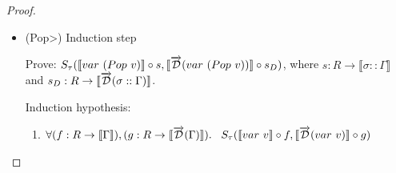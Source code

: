 \documentclass[11pt, final]{article}
\begin{document}
\begin{proof}
\begin{enumerate}
\begin{itemize}
          \begin{align*}
            S&_\tau(\llbracket var\ Top \rrbracket \circ s, \llbracket \D(var\ Top) \rrbracket \circ s_D) \\
            &\Vdash \text{(Definition of $\D$)} \\
            & S_\tau(\llbracket var\ Top \rrbracket \circ s, \llbracket var\ Top \rrbracket \circ s_D) \\
            &\Vdash \text{(Definition of $\circ$)} \\
            & S_\tau(\lambda x. \llbracket var\ Top \rrbracket (s(x)), \lambda x. \llbracket var\ Top \rrbracket (s_D(x))) \\
            &\Vdash \text{(Definition of $\llbracket\rrbracket$)} \\
            & S_\tau(\lambda x. lookup\ \llbracket Top \rrbracket (s(x)), \lambda x. lookup\ \llbracket Top \rrbracket (s_D(x))) \\
            &\Vdash \text{(Rewrite using $s = \lambda x. hd(s(x))::tl(s(x))$)} \\
            & S_\tau(\lambda x. lookup\ \llbracket Top \rrbracket (hd(s(x))::tl(s(x))), \\
              & \;\;\; \lambda x. lookup\ \llbracket Top \rrbracket (hd(s_D(x))::tl(s_D(x)))) \\
            & \Vdash \text{(Simplify with lookup and $\llbracket Top \rrbracket$)} \\
            & S_\tau(\lambda x. hd(s(x)), \lambda x. hd(s_D(x))) \\
            & \Vdash \text{(By definition of $inst_{\tau::\Gamma}$)} \\
          \end{align*} \qed

          \item(\<Pop>) Induction step

          Prove: $S_\tau(\llbracket var\ (Pop\ v) \rrbracket \circ s, \llbracket \overrightarrow{\mathcal{D}}(var\ (Pop\ v)) \rrbracket \circ s_D)$, where $s : R \rightarrow \llbracket \sigma :: \Gamma \rrbracket$ and $s_D : R \rightarrow \llbracket \overrightarrow{\mathcal{D}}(\sigma :: \Gamma) \rrbracket$.

          Induction hypothesis:
          \begin{enumerate}\label{eqn:subst_ih_var_Pop}
            \item $\forall (f : R \rightarrow \llbracket \Gamma \rrbracket), (g : R \rightarrow \llbracket \overrightarrow{\mathcal{D}}(\Gamma) \rrbracket). \\
            \;\;\;S_\tau(\llbracket var\ v \rrbracket \circ f, \llbracket \overrightarrow{\mathcal{D}}(var\ v) \rrbracket \circ g)$
          \end{enumerate}


\end{itemize}
\end{enumerate}
\end{proof}
\end{document}
